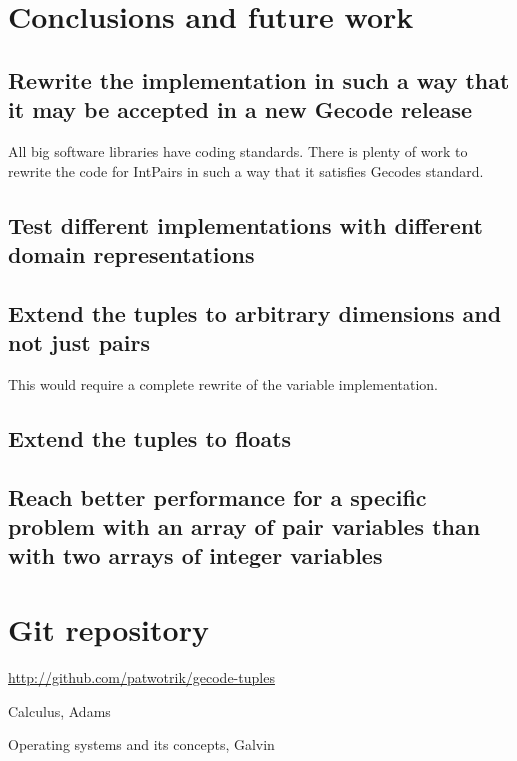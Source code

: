 \documentclass[a4paper,11pt]{article}
\begin{document}
\section{Conclusions and future work}

\subsection{Rewrite the implementation in such a way that it may be accepted in a new Gecode release}
All big software libraries have coding standards. There is plenty of work to rewrite the code for IntPairs in such a way that it satisfies Gecodes standard.
\subsection{Test different implementations with different domain representations}
\subsection{Extend the tuples to arbitrary dimensions and not just pairs}
This would require a complete rewrite of the variable implementation.
\subsection{Extend the tuples to floats}
\subsection{Reach better performance for a specific problem with an array of pair variables than with two arrays of integer variables}

\section{Git repository}
\url{http://github.com/patwotrik/gecode-tuples}

\begin{thebibliography}{99}
	Calculus, 
	Adams
	
	Operating systems and its concepts,
	Galvin
\end{thebibliography}
\end{document}
